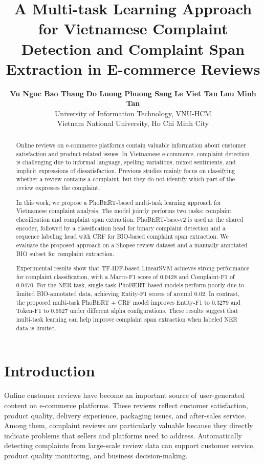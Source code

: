\documentclass[11pt]{article}
\title{A Multi-task Learning Approach for Vietnamese Complaint Detection and Complaint Span Extraction in E-commerce Reviews}
\author{
\begin{tabular}{c}
\textbf{Vu Ngoc Bao Thang} \quad
\textbf{Do Luong Phuong Sang} \quad
\textbf{Le Viet Tan} \quad
\textbf{Luu Minh Tan} \\
University of Information Technology, VNU-HCM \\
Vietnam National University, Ho Chi Minh City \\
\end{tabular}
}
\begin{document}
\maketitle

\begin{abstract}
Online reviews on e-commerce platforms contain valuable information about customer satisfaction and product-related issues. In Vietnamese e-commerce, complaint detection is challenging due to informal language, spelling variations, mixed sentiments, and implicit expressions of dissatisfaction. Previous studies mainly focus on classifying whether a review contains a complaint, but they do not identify which part of the review expresses the complaint.

In this work, we propose a PhoBERT-based multi-task learning approach for Vietnamese complaint analysis. The model jointly performs two tasks: complaint classification and complaint span extraction. PhoBERT-base-v2 is used as the shared encoder, followed by a classification head for binary complaint detection and a sequence labeling head with CRF for BIO-based complaint span extraction. We evaluate the proposed approach on a Shopee review dataset and a manually annotated BIO subset for complaint extraction.

Experimental results show that TF-IDF-based LinearSVM achieves strong performance for complaint classification, with a Macro-F1 score of 0.9428 and Complaint-F1 of 0.9470. For the NER task, single-task PhoBERT-based models perform poorly due to limited BIO-annotated data, achieving Entity-F1 scores of around 0.02. In contrast, the proposed multi-task PhoBERT + CRF model improves Entity-F1 to 0.3279 and Token-F1 to 0.6627 under different alpha configurations. These results suggest that multi-task learning can help improve complaint span extraction when labeled NER data is limited.
\end{abstract}

\section{Introduction}

Online customer reviews have become an important source of user-generated content on e-commerce platforms. These reviews reflect customer satisfaction, product quality, delivery experience, packaging issues, and after-sales service. Among them, complaint reviews are particularly valuable because they directly indicate problems that sellers and platforms need to address. Automatically detecting complaints from large-scale review data can support customer service, product quality monitoring, and business decision-making.
\end{document}
